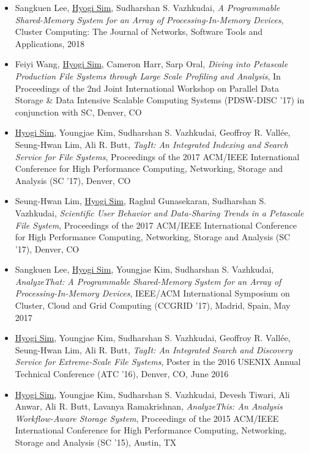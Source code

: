 \begin{itemize}
\item Sangkuen Lee, \underline{Hyogi Sim}, Sudharshan S. Vazhkudai,
  {\it A Programmable Shared-Memory System for an Array of Processing-In-Memory Devices},
  Cluster Computing: The Journal of Networks, Software Tools and Applications, 2018
\item Feiyi Wang, \underline{Hyogi Sim}, Cameron Harr, Sarp Oral,
  {\it Diving into Petascale Production File Systems through
       Large Scale Profiling and Analysis},
  In Proceedings of the 2nd Joint International Workshop on Parallel Data Storage
  \& Data Intensive Scalable Computing Systems (PDSW-DISC '17)
  in conjunction with SC, Denver, CO
\item \underline{Hyogi Sim}, Youngjae Kim, Sudharshan S. Vazhkudai,
  Geoffroy R. Vall\'ee, Seung-Hwan Lim, Ali R. Butt,
  {\it TagIt: An Integrated Indexing and Search Service for File Systems},
  Proceedings of the 2017 ACM/IEEE International Conference for High
  Performance Computing, Networking, Storage and Analysis (SC '17), Denver, CO
\item Seung-Hwan Lim, \underline{Hyogi Sim}, Raghul Gunasekaran,
  Sudharshan S. Vazhkudai,
  {\it Scientific User Behavior and Data-Sharing Trends in a Petascale File System},
  Proceedings of the 2017 ACM/IEEE International Conference for High
  Performance Computing, Networking, Storage and Analysis (SC '17), Denver, CO
\item Sangkuen Lee, \underline{Hyogi Sim}, Youngjae Kim,
  Sudharshan S. Vazhkudai,
  {\it AnalyzeThat: A Programmable Shared-Memory System for an Array of Processing-In-Memory Devices},
  IEEE/ACM International Symposium on Cluster, Cloud and Grid Computing
  (CCGRID '17), Madrid, Spain, May 2017
\item \underline{Hyogi Sim}, Youngjae Kim, Sudharshan S. Vazhkudai,
  Geoffroy R. Vall\'ee, Seung-Hwan Lim, Ali R. Butt,
  {\it TagIt: An Integrated Search and Discovery Service for Extreme-Scale File
  Systems},
  Poster in the 2016 USENIX Annual Technical Conference (ATC '16),
  Denver, CO, June 2016 %
\item \underline{Hyogi Sim}, Youngjae Kim, Sudharshan S. Vazhkudai,
  Devesh Tiwari, Ali Anwar, Ali R. Butt, Lavanya Ramakrishnan,
  {\it AnalyzeThis: An Analysis Workflow-Aware Storage System},
  Proceedings of the 2015 ACM/IEEE International Conference for High
  Performance Computing, Networking, Storage and Analysis (SC '15), Austin, TX

\end{itemize}
